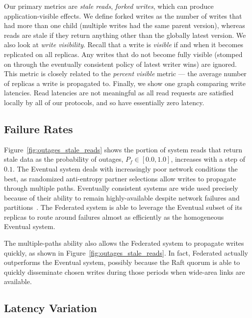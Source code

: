 \documentclass[10pt,conference,letterpaper]{IEEEtran}
\begin{document}
Our primary metrics are \textit{stale reads}, \textit{forked writes}, which can produce
application-visible effects.
We define forked writes as the number of writes that had more than one child (multiple
writes had the same parent version), whereas reads are stale if they return anything other
than the globally latest version.
We also look at \emph{write visibility}.
Recall that a write is \emph{visible} if and when it becomes replicated on all replicas.
Any writes that do not become fully visible (stomped on through the eventually consistent
policy of latest writer wins) are ignored.
This metric is closely related to the \textit{percent visible} metric --- the average
number of replicas a write is propagated to.
Finally, we show one graph comparing write latencies.
Read latencies are not meaningful as all read requests are satisfied locally by all of our
protocols, and so have essentially zero latency.

\subsection{Failure Rates}

Figure~\ref{fig:outages_stale_reads} shows the portion of system reads that return stale
data as the probability of outages, $P_f \in [0.0,1.0]$, increases with a step of $0.1$.
The Eventual system deals with increasingly poor network conditions the best,
as randomized anti-entropy partner selections allow writes to propagate through multiple
paths.
Eventually consistent systems are wide used precisely because of their ability to remain
highly-available despite network failures and
partitions~\cite{bailis_bolt-causal_2013,bailis_probabilistically_2012,bailis_quantifying_2014}.
The Federated system is able to leverage the Eventual subset of its replicas to route
around failures almost as efficiently as the homogeneous Eventual system.

The multiple-paths ability also allows the Federated system to propagate writes quickly,
as shown in Figure~\ref{fig:outages_stale_reads}. In fact, Federated actually outperforms the
Eventual system, possibly because the Raft quorum is able to quickly disseminate chosen
writes during those periods when wide-area links are available.

\subsection{Latency Variation}
\end{document}
